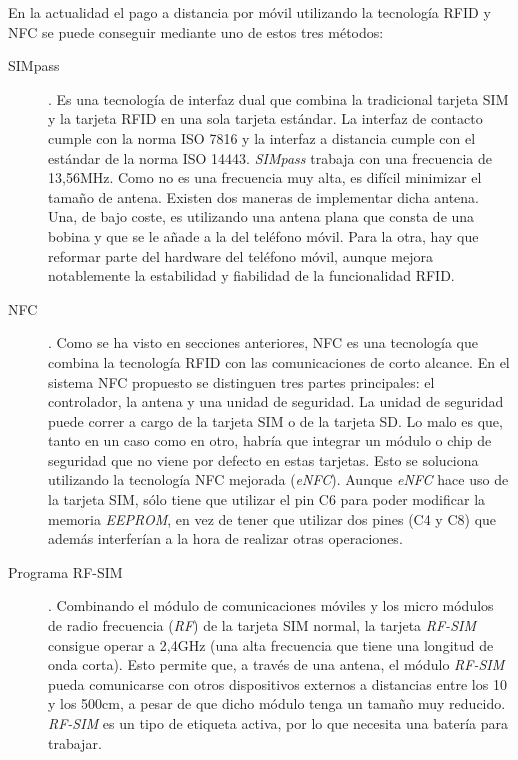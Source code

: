   En la actualidad el pago a distancia por móvil utilizando la tecnología
  \acs{RFID} y \acs{NFC} se puede conseguir mediante uno de estos tres métodos:
  \begin{description}
  \item[SIMpass]. Es una tecnología de interfaz dual que combina la
  tradicional tarjeta \acs{SIM} y la tarjeta \acs{RFID} en una sola tarjeta
  estándar. La interfaz de contacto cumple con la norma \acs{ISO} 7816 y la
  interfaz a distancia cumple con el estándar de la norma \acs{ISO} 14443.
  \emph{SIMpass} trabaja con una frecuencia de 13,56MHz. Como no es una
  frecuencia muy alta, es difícil minimizar el tamaño de antena. Existen dos
  maneras de implementar dicha antena. Una, de bajo coste, es utilizando una 
  antena plana que consta de una bobina y que se le añade a la del teléfono
  móvil. Para la otra, hay que reformar parte del hardware del teléfono
  móvil, aunque mejora notablemente la estabilidad y fiabilidad de la
  funcionalidad \acs{RFID}.

  \item[\acs{NFC}]. Como se ha visto en secciones anteriores, \acs{NFC} es una
  tecnología que combina la tecnología \acs{RFID} con las comunicaciones de
  corto alcance. En el sistema \acs{NFC} propuesto se distinguen tres partes 
  principales: el controlador, la antena y una unidad de seguridad. La unidad
  de seguridad puede correr a cargo de la tarjeta \acs{SIM} o de la tarjeta
  \acs{SD}. Lo malo es que, tanto en un caso como en otro, habría que integrar
  un módulo o chip de seguridad que no viene por defecto en estas tarjetas.
  Esto se soluciona utilizando la tecnología \acs{NFC} mejorada (\emph{eNFC}).
  Aunque \emph{eNFC} hace uso de la tarjeta \acs{SIM}, sólo tiene que utilizar
  el pin C6 para poder modificar la memoria \emph{EEPROM}, en vez de tener
  que utilizar dos pines (C4 y C8) que además interferían a la hora de
  realizar otras operaciones.

    \item[Programa RF-SIM]. Combinando el módulo de comunicaciones móviles y
  los micro módulos de radio frecuencia (\emph{RF}) de la tarjeta \acs{SIM}
  normal, la tarjeta \emph{RF-SIM} consigue operar a 2,4GHz (una alta 
  frecuencia que tiene una longitud de onda corta). Esto permite que, a través
  de una antena, el módulo \emph{RF-SIM} pueda comunicarse con otros 
  dispositivos externos a distancias entre los 10 y los 500cm, a pesar de que
  dicho módulo tenga un tamaño muy reducido. \emph{RF-SIM} es un tipo de
  etiqueta activa, por lo que necesita una batería para trabajar.
  \end{description}

